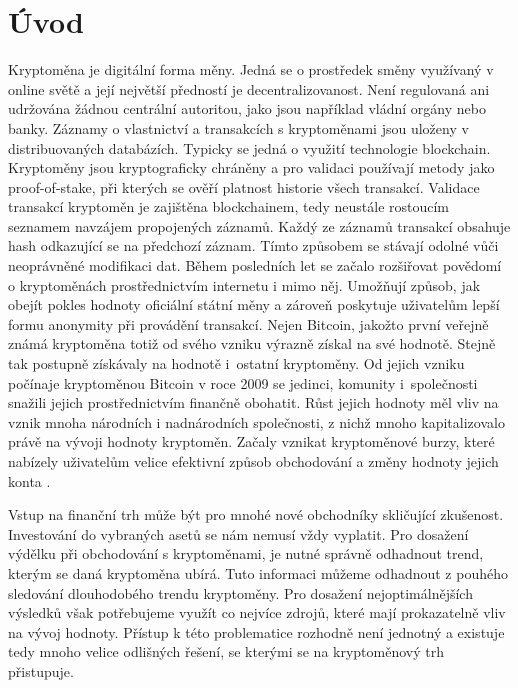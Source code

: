 \chapter*{Úvod}
Kryptoměna je digitální forma měny.
Jedná se o prostředek směny využívaný v online světě a její největší předností je decentralizovanost.
Není regulovaná ani udržována žádnou centrální autoritou, jako jsou například vládní orgány nebo banky.
Záznamy o vlastnictví a transakcích s kryptoměnami jsou uloženy v distribuovaných databázích.
Typicky se jedná o využití technologie blockchain. 
Kryptoměny jsou kryptograficky chráněny a pro validaci používají metody jako proof-of-stake, při kterých se ověří platnost historie všech transakcí. 
Validace transakcí kryptoměn je zajištěna blockchainem, tedy neustále rostoucím seznamem navzájem propojených záznamů. 
Každý ze záznamů transakcí obsahuje hash odkazující se na předchozí záznam. 
Tímto způsobem se stávají odolné vůči neoprávněné modifikaci dat. Během posledních let se začalo rozšiřovat povědomí o kryptoměnách prostřednictvím internetu i mimo něj.
Umožňují způsob, jak obejít pokles hodnoty oficiální státní měny a zároveň poskytuje uživatelům lepší formu anonymity při provádění transakcí.
Nejen Bitcoin, jakožto první veřejně známá kryptoměna totiž od svého vzniku výrazně získal na své hodnotě. 
Stejně tak postupně získávaly na hodnotě i~ostatní kryptoměny. 
Od jejich vzniku počínaje kryptoměnou Bitcoin v roce 2009 se jedinci, komunity i~společnosti snažili jejich prostřednictvím finančně obohatit. 
Růst jejich hodnoty měl vliv na vznik mnoha národních i nadnárodních společnosti, z nichž mnoho kapitalizovalo právě na vývoji hodnoty kryptoměn. 
Začaly vznikat kryptoměnové burzy, které nabízely uživatelům velice efektivní způsob obchodování a změny hodnoty jejich konta \cite{cryptodef:1, cryptodef:2}.

Vstup na finanční trh může být pro mnohé nové obchodníky skličující zkušenost. 
Investování do vybraných asetů se nám nemusí vždy vyplatit. 
Pro dosažení výdělku při obchodování s kryptoměnami, je nutné správně odhadnout trend, kterým se daná kryptoměna ubírá. 
Tuto informaci můžeme odhadnout z pouhého sledování dlouhodobého trendu kryptoměny. 
Pro dosažení nejoptimálnějších výsledků však potřebujeme využít co nejvíce zdrojů, které mají prokazatelně vliv na vývoj hodnoty. 
Přístup k této problematice rozhodně není jednotný a existuje tedy mnoho velice odlišných řešení, se kterými se na kryptoměnový trh přistupuje.

